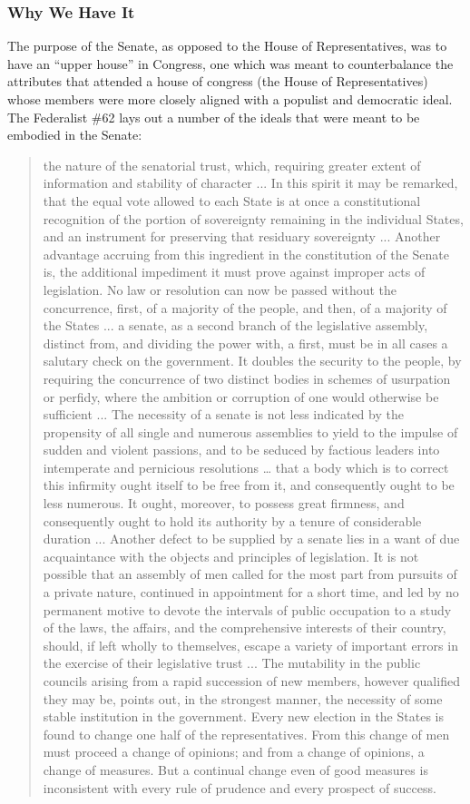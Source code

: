 \subsubsection{Why We Have It}
The purpose of the Senate, as opposed to the House of Representatives, was to have an ``upper house'' in Congress, one which was meant to counterbalance the attributes that attended a house of congress (the House of Representatives) whose members were more closely aligned with a populist and democratic ideal.  The Federalist \#62 lays out a number of the ideals that were meant to be embodied in the Senate:

\begin{quote}
the nature of the senatorial trust, which, requiring greater extent of information and stability of character ... In this spirit it may be remarked, that the equal vote allowed to each State is at once a constitutional recognition of the portion of sovereignty remaining in the individual States, and an instrument for preserving that residuary sovereignty ... Another advantage accruing from this ingredient in the constitution of the Senate is, the additional impediment it must prove against improper acts of legislation. No law or resolution can now be passed without the concurrence, first, of a majority of the people, and then, of a majority of the States ... a senate, as a second branch of the legislative assembly, distinct from, and dividing the power with, a first, must be in all cases a salutary check on the government. It doubles the security to the people, by requiring the concurrence of two distinct bodies in schemes of usurpation or perfidy, where the ambition or corruption of one would otherwise be sufficient ... The necessity of a senate is not less indicated by the propensity of all single and numerous assemblies to yield to the impulse of sudden and violent passions, and to be seduced by factious leaders into intemperate and pernicious resolutions … that a body which is to correct this infirmity ought itself to be free from it, and consequently ought to be less numerous. It ought, moreover, to possess great firmness, and consequently ought to hold its authority by a tenure of considerable duration ... Another defect to be supplied by a senate lies in a want of due acquaintance with the objects and principles of legislation. It is not possible that an assembly of men called for the most part from pursuits of a private nature, continued in appointment for a short time, and led by no permanent motive to devote the intervals of public occupation to a study of the laws, the affairs, and the comprehensive interests of their country, should, if left wholly to themselves, escape a variety of important errors in the exercise of their legislative trust ... The mutability in the public councils arising from a rapid succession of new members, however qualified they may be, points out, in the strongest manner, the necessity of some stable institution in the government. Every new election in the States is found to change one half of the representatives. From this change of men must proceed a change of opinions; and from a change of opinions, a change of measures. But a continual change even of good measures is inconsistent with every rule of prudence and every prospect of success.

\end{quote}
